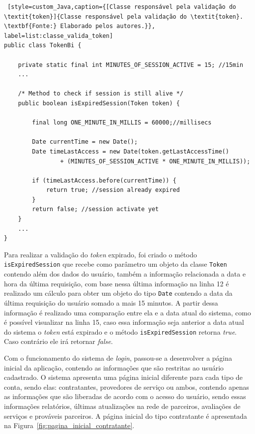 \begin{lstlisting} [style=custom_Java,caption={[Classe responsável pela validação do \textit{token}]{Classe responsável pela validação do \textit{token}. \textbf{Fonte:} Elaborado pelos autores.}}, label=list:classe_valida_token]
public class TokenBi {
	
	private static final int MINUTES_OF_SESSION_ACTIVE = 15; //15min
	...
	
	/* Method to check if session is still alive */
	public boolean isExpiredSession(Token token) {
		
		final long ONE_MINUTE_IN_MILLIS = 60000;//millisecs
		
		Date currentTime = new Date();
		Date timeLastAccess = new Date(token.getLastAccessTime() 
				+ (MINUTES_OF_SESSION_ACTIVE * ONE_MINUTE_IN_MILLIS));
		
		if (timeLastAccess.before(currentTime)) {
			return true; //session already expired
		}
		return false; //session activate yet
	}
	...
}
\end{lstlisting}

Para realizar a validação do \textit{token} expirado, foi criado o método \texttt{isExpiredSession} que  recebe como parâmetro um objeto da classe \texttt{Token} contendo além dos dados do usuário, também a informação relacionada a data e hora da última requisição, com base nessa última informação na linha 12 é realizado um cálculo para obter um objeto do tipo \texttt{Date} contendo a data da última requisição do usuário somado a mais 15 minutos. A partir dessa informação é realizado uma comparação entre ela e a data atual do sistema, como é possível visualizar na linha 15, caso essa informação seja anterior a data atual do sistema o \textit{token} está expirado e o método \texttt{isExpiredSession} retorna \textit{true}. Caso contrário ele irá retornar \textit{false}.

\par Com o funcionamento do sistema de \textit{login}, passou-se a desenvolver a página inicial da aplicação, contendo as informações que são restritas ao usuário cadastrado. O sistema apresenta uma página inicial diferente para cada tipo de conta, sendo elas: contratantes, provedores de serviço ou ambos, contendo apenas as informações que são liberadas de acordo com o acesso do usuário, sendo essas informações relatórios, últimas atualizações na rede de parceiros, avaliações de serviços e prováveis parceiros. A página inicial do tipo contratante é apresentada na Figura~\ref{fig:pagina_inicial_contratante}.

